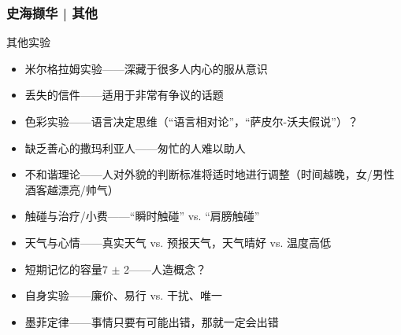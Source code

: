 \begin{frame}
  \frametitle{史海撷华 | 其他}
  \begin{block}{其他实验}
    \begin{itemize}
      \item 米尔格拉姆实验——深藏于很多人内心的服从意识
      \item 丢失的信件——适用于非常有争议的话题
      \item 色彩实验——语言决定思维（“语言相对论”，“萨皮尔-沃夫假说”）？
      \item 缺乏善心的撒玛利亚人——\alert{匆忙的人难以助人}
      \item 不和谐理论——人对外貌的判断标准将适时地进行调整（时间越晚，女/男性酒客越漂亮/帅气）
      \item 触碰与治疗/小费——“瞬时触碰” vs. “肩膀触碰”
      \item 天气与心情——真实天气 vs. 预报天气，天气晴好 vs. 温度高低
      \item \alert{短期记忆的容量7 $\pm$ 2}——人造概念？
      \item 自身实验——廉价、易行 vs. 干扰、唯一
      \item \alert{墨菲定律}——事情只要有可能出错，那就一定会出错
    \end{itemize}
  \end{block}
\end{frame}



